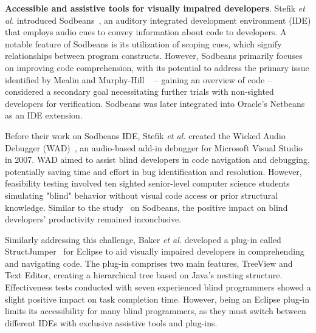 

{\bf Accessible and assistive tools for visually impaired developers}.
Stefik {\em et al.} introduced Sodbeans~\cite{stefik11}, an auditory
integrated development environment (IDE) that employs audio cues to
convey information about code to developers. A notable feature of
Sodbeans is its utilization of scoping cues, which signify
relationships between program constructs.
However, Sodbeans primarily focuses on improving code comprehension,
with its potential to address the primary issue identified by Mealin
and Murphy-Hill ~\cite{mealin-vlhcc12} – gaining an overview of code – considered a
secondary goal necessitating further trials with non-sighted
developers for verification. Sodbeans was later integrated into
Oracle's Netbeans as an IDE extension.

Before their work on Sodbeans IDE, Stefik {\em et al.} created the
Wicked Audio Debugger (WAD)~\cite{wad07}, an audio-based add-in debugger for
Microsoft Visual Studio in 2007. WAD aimed to assist blind developers
in code navigation and debugging, potentially saving time and effort
in bug identification and resolution. However, feasibility testing
involved ten sighted senior-level computer science students simulating
"blind" behavior without visual code access or prior structural
knowledge. Similar to the study~\cite{stefik11} on Sodbeans, the
positive impact on blind developers' productivity remained
inconclusive.

Similarly addressing this challenge, Baker {\em et al.} developed a
plug-in called StructJumper~\cite{BakerML15} for Eclipse to aid
visually impaired developers in comprehending and navigating code. The
plug-in comprises two main features, TreeView and Text Editor,
creating a hierarchical tree based on Java's nesting
structure. Effectiveness tests conducted with seven experienced blind
programmers showed a slight positive impact on task completion time.
However, being an Eclipse plug-in limits its accessibility for many blind programmers, as they must switch between different IDEs with exclusive assistive tools and plug-ins.

